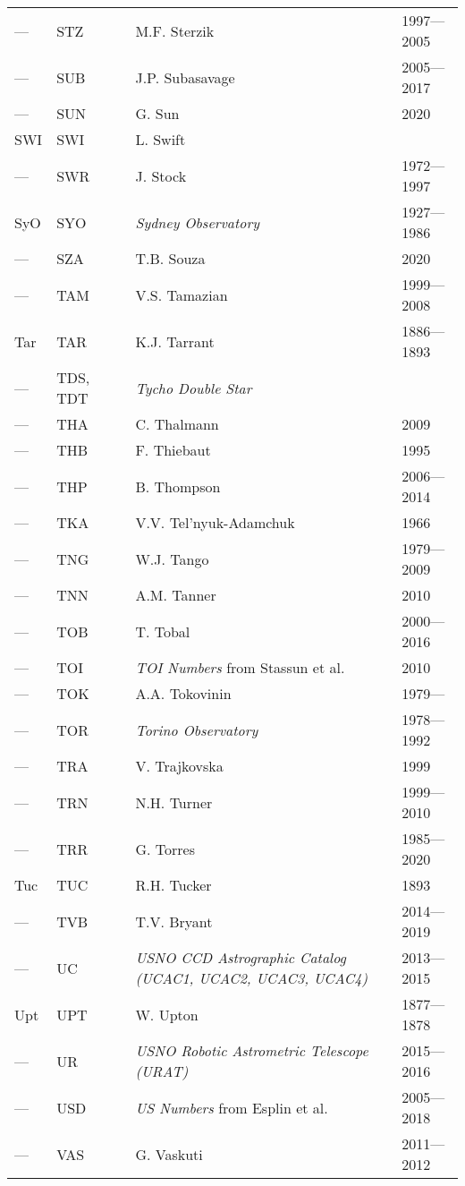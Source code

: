 \begin{longtable}{l|l|c|p{59mm}|l}
--- & STZ &   & M.F. Sterzik & 1997---2005 \\
--- & SUB &   & J.P. Subasavage & 2005---2017 \\
--- & SUN &   & G. Sun & 2020 \\
SWI & SWI &   & L. Swift & \\
--- & SWR &   & J. Stock & 1972---1997 \\
SyO & SYO &   & \emph{Sydney Observatory} & 1927---1986 \\
--- & SZA &   & T.B. Souza & 2020 \\\midrule
--- & TAM &   & V.S. Tamazian & 1999---2008 \\
Tar & TAR &   & K.J. Tarrant & 1886---1893 \\
--- & TDS, TDT &   & \emph{Tycho Double Star} & \\
--- & THA &   & C. Thalmann & 2009 \\
--- & THB &   & F. Thiebaut & 1995 \\
--- & THP &   & B. Thompson & 2006---2014 \\
--- & TKA &   & V.V. Tel'nyuk-Adamchuk & 1966 \\
--- & TNG &   & W.J. Tango & 1979---2009 \\
--- & TNN &   & A.M. Tanner & 2010 \\
--- & TOB &   & T. Tobal  & 2000---2016 \\
--- & TOI &   & \emph{TOI Numbers} from Stassun et al. & 2010 \\
--- & TOK &   & A.A. Tokovinin & 1979--- \\
--- & TOR &   & \emph{Torino Observatory} & 1978---1992 \\
--- & TRA &   & V. Trajkovska & 1999 \\
--- & TRN &   & N.H. Turner & 1999---2010 \\
--- & TRR &   & G. Torres & 1985---2020 \\
Tuc & TUC &   & R.H. Tucker & 1893 \\
--- & TVB &   & T.V. Bryant & 2014---2019 \\\midrule
--- & UC  &   & \emph{USNO CCD Astrographic Catalog (UCAC1, UCAC2, UCAC3, UCAC4) } & 2013---2015 \\
Upt & UPT &   & W. Upton & 1877---1878 \\
--- & UR  &   & \emph{USNO Robotic Astrometric Telescope (URAT) } & 2015---2016 \\
--- & USD &   & \emph{US Numbers} from Esplin et al. & 2005---2018 \\\midrule
--- & VAS &   & G. Vaskuti & 2011---2012 \\

\end{longtable}
